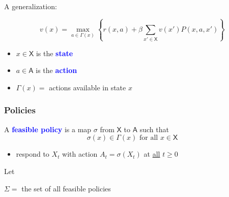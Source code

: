 \documentclass[xcolor=dvipsnames]{beamer}
\renewcommand{\geq}{\geqslant}
\newcommand{\navy}[1]{\textcolor{Blue}{\bf #1}}
\newcommand{\Asf}{\mathsf A}
\newcommand{\Xsf}{\mathsf X}
\renewcommand{\geq}{\geqslant}
\newcommand{\1}{\mathbbm 1}
\begin{document}
\begin{frame}

    A generalization:

    \begin{equation*}
            v(x)
            = \max_{a \in \Gamma(x)}
            \left\{
                r(x, a)
                + \beta
                \sum_{x' \in \Xsf} v(x') P(x, a, x')
            \right\}
    \end{equation*}
    \vspace{0.5em}
    \vspace{0.5em}

    \begin{itemize}
        \item $x \in \Xsf$ is the \navy{state}
        \item $a \in \Asf$ is the \navy{action}
        \item $\Gamma(x) =$ actions available in state $x$
    \end{itemize}


\end{frame}






\begin{frame}
    \frametitle{Policies}

    
    A \navy{feasible policy} is a map $\sigma$ from $\Xsf$ to $\Asf$ such that
    \begin{equation*}
            \sigma(x) \in \Gamma(x) \text{ for all } x \in \Xsf
    \end{equation*}

    \begin{itemize}
        \item respond to $X_t$ with action $A_t = \sigma(X_t)$ at 
        \underline{all} $t \geq 0$
    \end{itemize}

    \vspace{0.5em}
    \vspace{0.5em}
    \vspace{0.5em}

    Let 
    \begin{center}
            $\Sigma = $ the set of all feasible policies
    \end{center}




\end{frame}
\end{document}

